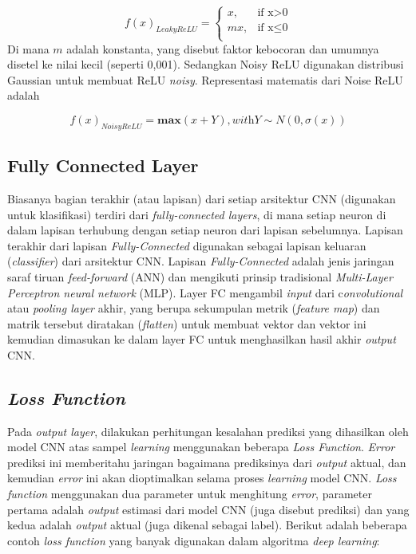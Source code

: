 \begin{enumerate}
	\begin{equation}
		f(x)_{LeakyReLU} =
		\begin{cases}
			x, & \text{if x$>$0}\\
			mx, & \text{if x$\leq$0}\\
		\end{cases}       
	\end{equation}  
	Di mana $m$ adalah konstanta, yang disebut faktor kebocoran dan umumnya disetel ke nilai kecil (seperti 0,001). Sedangkan Noisy ReLU digunakan distribusi Gaussian untuk membuat ReLU \textit{noisy}. Representasi matematis dari Noise ReLU adalah
	
	\begin{equation}
		f(x)_{NoisyReLU} = \textbf{max}(x + Y) , \textit{with} Y \sim N(0,\sigma(x))
	\end{equation}
	
\end{enumerate}

\subsection{Fully Connected Layer}
\label{subsec:fcn}

Biasanya bagian terakhir (atau lapisan) dari setiap arsitektur CNN (digunakan untuk klasifikasi) terdiri dari \textit{fully-connected layers}, di mana setiap neuron di dalam lapisan terhubung dengan setiap neuron dari lapisan sebelumnya. Lapisan terakhir dari lapisan \textit{Fully-Connected} digunakan sebagai lapisan keluaran (\textit{classifier}) dari arsitektur CNN. Lapisan \textit{Fully-Connected} adalah jenis jaringan saraf tiruan \textit{feed-forward} (ANN) dan mengikuti prinsip tradisional \textit{Multi-Layer Perceptron neural network} (MLP). Layer FC mengambil \textit{input} dari c\textit{onvolutional} atau \textit{pooling layer} akhir, yang berupa sekumpulan metrik (\textit{feature map}) dan matrik tersebut diratakan (\textit{flatten}) untuk membuat vektor dan vektor ini kemudian dimasukan ke dalam layer FC untuk menghasilkan hasil akhir \textit{output} CNN.

\subsection{\textit{Loss Function}}
\label{subsec:lossfunction}

Pada \textit{output layer}, dilakukan perhitungan kesalahan prediksi yang dihasilkan oleh model CNN atas sampel \textit{learning} menggunakan beberapa \textit{Loss Function}. \textit{Error} prediksi ini memberitahu jaringan bagaimana prediksinya dari \textit{output} aktual, dan kemudian \textit{error} ini akan dioptimalkan selama proses \textit{learning} model CNN. \textit{Loss function} menggunakan dua parameter untuk menghitung \textit{error}, parameter pertama adalah \textit{output} estimasi dari model CNN (juga disebut prediksi) dan yang kedua adalah \textit{output} aktual (juga dikenal sebagai label). Berikut adalah beberapa contoh \textit{loss function} yang banyak digunakan dalam algoritma \textit{deep learning}:


